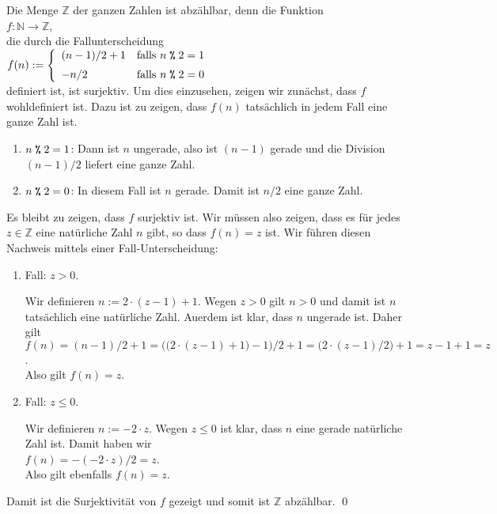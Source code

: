 \example
Die Menge $\mathbb{Z}$ der ganzen Zahlen ist abz\"{a}hlbar, denn die Funktion
\\[0.2cm]
\hspace*{1.3cm}
$f: \mathbb{N} \rightarrow \mathbb{Z}$,
\\[0.2cm]
die durch die Fallunterscheidung
\\[0.2cm]
\hspace*{1.3cm}
$f(n) := \left\{ \begin{array}[c]{ll}
                 (n - 1) / 2 + 1  & \mbox{falls $n \;\texttt{\%}\; 2 = 1$}  \\[0.2cm]
                 - n / 2          & \mbox{falls $n \;\texttt{\%}\; 2 = 0$}
                 \end{array}
         \right.
$ 
\\[0.2cm]
definiert ist, ist surjektiv.  Um dies einzusehen, zeigen wir zun\"{a}chst, dass $f$ wohldefiniert ist.
Dazu ist zu zeigen, dass $f(n)$ tats\"{a}chlich in jedem Fall eine ganze Zahl ist.
\begin{enumerate}
\item $n \;\texttt{\%}\; 2 = 1$:  Dann ist $n$ ungerade, also ist $(n-1)$ gerade und die Division
      $(n-1)/2$ liefert eine ganze Zahl.
\item $n \;\texttt{\%}\; 2 = 0$:  In diesem Fall ist $n$ gerade.  Damit ist $n/2$ eine ganze Zahl.
\end{enumerate}
Es bleibt zu zeigen, dass $f$ surjektiv ist.  Wir m\"{u}ssen also zeigen, dass es f\"{u}r jedes 
$z \in \mathbb{Z}$ eine nat\"{u}rliche Zahl $n$ gibt, so dass $f(n) = z$ ist.  Wir f\"{u}hren diesen Nachweis
mittels einer Fall-Unterscheidung:
\begin{enumerate}
\item Fall: $z > 0$.
  
      Wir definieren $n := 2 \cdot (z - 1) + 1$.  Wegen $z >0$ gilt $n > 0$ und damit ist $n$
      tats\"{a}chlich eine nat\"{u}rliche Zahl.  Au\3erdem ist klar, dass $n$ ungerade ist. Daher gilt
      \\[0.2cm]
      \hspace*{0.3cm}
      $f(n) = (n - 1)/2 + 1 = \bigl(\bigl(2 \cdot (z - 1) + 1\bigr) - 1\bigr)/2 + 1 
            = \bigl(2 \cdot (z - 1)/2\bigr) + 1= z-1 + 1 = z
      $.
      \\[0.2cm]
      Also gilt $f(n) = z$.
\item Fall: $z \leq 0$.

      Wir definieren $n := - 2 \cdot z$.  Wegen $z \leq 0$ ist klar, dass $n$ eine gerade 
      nat\"{u}rliche Zahl ist.  Damit haben wir
      \\[0.2cm]
      \hspace*{1.3cm}
      $f(n) = -(-2 \cdot z)/2 = z$.
      \\[0.2cm]
      Also gilt ebenfalls $f(n) = z$.
\end{enumerate}
Damit ist die Surjektivit\"{a}t von $f$ gezeigt und somit ist $\mathbb{Z}$ abz\"{a}hlbar.
\qed

